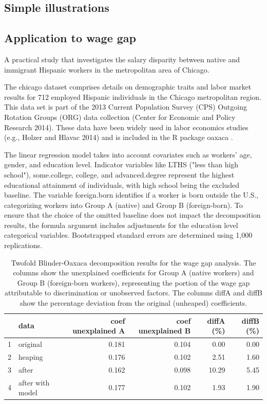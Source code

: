 \documentclass[pdflatex,sn-mathphys-num]{sn-jnl}%
\theoremstyle{thmstyleone}%
\theoremstyle{thmstyletwo}%
\theoremstyle{thmstylethree}%
\begin{document}
\subsection{Simple illustrations}

\subsection{Application to wage gap}

A practical study that investigates the salary disparity between native and immigrant Hispanic workers in the metropolitan area of Chicago.

The chicago dataset comprises details on demographic traits and labor market results for 712 employed Hispanic individuals in the Chicago metropolitan region. This data set is part of the 2013 Current Population Survey (CPS) Outgoing Rotation Groups (ORG) data collection (Center for Economic and Policy Research 2014). These data have been widely used in labor economics studies (e.g., Holzer and Hlavac 2014) and is included in the R package oaxaca \citep{oaxaca}.


The linear regression model takes into account covariates such as workers' age, gender, and education level. Indicator variables like LTHS ("less than high school"), some.college, college, and advanced.degree represent the highest educational attainment of individuals, with high school being the excluded baseline. The variable foreign.born identifies if a worker is born outside the U.S., categorizing workers into Group A (native) and Group B (foreign-born). To ensure that the choice of the omitted baseline does not impact the decomposition results, the formula argument includes adjustments for the education level categorical variables. Bootstrapped standard errors are determined using 1,000 replications.

\begin{table}[ht]
\centering
\begin{tabular}{rlrrrr}
  \hline
 & data & coef unexplained A & coef unexplained B & diffA (\%) & diffB (\%) \\
  \hline
1 & original & 0.181 & 0.104 & 0.00 & 0.00 \\
  2 & heaping & 0.176 & 0.102 & 2.51 & 1.60 \\
  3 & after & 0.162 & 0.098 & 10.29 & 5.45 \\
  4 & after with model & 0.177 & 0.102 & 1.93 & 1.90 \\
   \hline
\end{tabular}
\caption{Twofold Blinder-Oaxaca decomposition results for the wage gap analysis. The columns show the unexplained coefficients for Group A (native workers) and Group B (foreign-born workers), representing the portion of the wage gap attributable to discrimination or unobserved factors. The columns diffA and diffB show the percentage deviation from the original (unheaped) coefficients.}
\label{tab:twofold}
\end{table}
\end{document}
